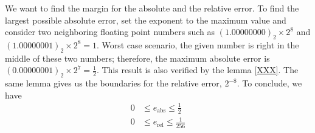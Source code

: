 %
%
\begin{exmp}
    We want to find the margin for the absolute and the relative error. To find the largest possible absolute error, set the exponent to the maximum value and consider two neighboring floating point numbers such as \((1.00000000)_2 \times 2^8\) and \((1.00000001)_2 \times 2^8 = 1\). Worst case scenario, the given number is right in the middle of these two numbers; therefore, the maximum absolute error is \((0.00000001)_2 \times 2^7 = \frac{1}{2}\). This result is also verified by the lemma \ref{XXX}. The same lemma gives us the boundaries for the relative error, \(2^{-8}\). To conclude, we have
    \begin{align*}
        0 &\leq e_\text{abs} \leq \frac{1}{2} \\
        0 &\leq e_\text{rel} \leq \frac{1}{256}
    \end{align*}
\end{exmp}
%
%
%
